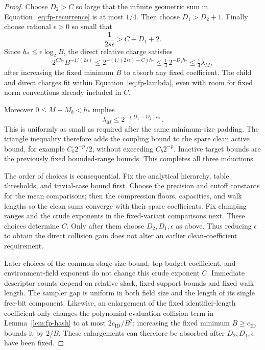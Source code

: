 \begin{proof}
Choose $D_2>C$ so large that the infinite geometric sum in
Equation~\eqref{eq:fp-recurrence} is at most $1/4$.  Then choose
$D_1>D_2+1$.  Finally choose rational $\epsilon>0$ so small that
\begin{equation}
                  \frac1{2s\epsilon}>C+D_1+2.
 \label{eq:fp-epsilon}
\end{equation}
Since $h_*\le\epsilon\log_2B$, the direct relative charge satisfies
\[
 2^{C h_*}B^{-1/(2s)}
 \le 2^{-(1/(2s\epsilon)-C)h_*}
 \le\tfrac14\,2^{-D_1h_*}
 \le\tfrac14\lambda_M,
\]
after increasing the fixed minimum $B$ to absorb any fixed coefficient.
The child and direct charges fit within Equation~\eqref{eq:fp-lambda},
even with room for fixed norm conventions already included in $C$.

Moreover $0\le M-M_b<h_*$ implies
\[
              \lambda_M\le2^{-(D_1-D_2)h_*}.
\]
This is uniformly as small as required after the same minimum-size
padding.  The triangle inequality therefore adds the coupling bound to
the spare clean active bound, for example $C_b2^{-p}/2$, without
exceeding $C_b2^{-p}$.  Inactive target bounds are the previously fixed
bounded-range bounds.  This completes all three inductions.

The order of choices is consequential.  Fix the analytical hierarchy,
table thresholds, and trivial-case bound first.  Choose the precision
and cutoff constants for the mean comparisons; then the compression
floors, capacities, and walk lengths so the clean sums converge with
their spare coefficients.  Fix clamping ranges and the crude exponents
in the fixed-variant comparisons next.  These choices determine $C$.
Only after them choose $D_2,D_1,\epsilon$ as above.  Thus reducing
$\epsilon$ to obtain the direct collision gain does not alter an
earlier clean-coefficient requirement.

Later choices of the common stage-size bound, top-budget coefficient,
and environment-field exponent do not change this crude exponent $C$.
Immediate descriptor counts depend on relative slack, fixed support
bounds and fixed walk length.  The sampler gap is uniform in both
field size and the length of its single free-bit component.  Likewise,
an enlargement of the fixed identifier-length coefficient only changes
the polynomial-evaluation collision term in Lemma~\ref{lem:fp-hash} to at most
$2c_{\mathrm{ID}}/B^2$; increasing the fixed minimum
$B\ge c_{\mathrm{ID}}$ bounds it by $2/B$.  These enlargements can
therefore be absorbed after $D_2,D_1,\epsilon$ have been fixed.
\end{proof}

